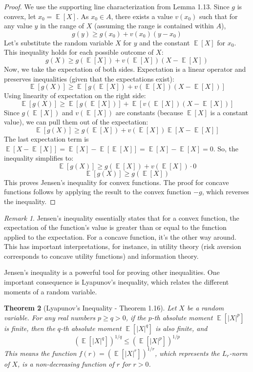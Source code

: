 \documentclass[11pt]{article}
\newtheorem{theorem}{Theorem}[section]
\theoremstyle{definition}
\theoremstyle{remark}
\newtheorem{remark}[theorem]{Remark}
\DeclareMathOperator{\E}{\mathbb{E}} %
\begin{document}
\begin{proof}
We use the supporting line characterization from Lemma 1.13. Since $g$ is convex, let $x_0 = \E[X]$. As $x_0 \in A$, there exists a value $v(x_0)$ such that for any value $y$ in the range of $X$ (assuming the range is contained within $A$),
\[
g(y) \ge g(x_0) + v(x_0)(y-x_0)
\]
Let's substitute the random variable $X$ for $y$ and the constant $\E[X]$ for $x_0$. This inequality holds for each possible outcome of $X$:
\[
g(X) \ge g(\E[X]) + v(\E[X])(X - \E[X])
\]
Now, we take the expectation of both sides. Expectation is a linear operator and preserves inequalities (given that the expectations exist):
\[
\E[g(X)] \ge \E[g(\E[X]) + v(\E[X])(X - \E[X])]
\]
Using linearity of expectation on the right side:
\[
\E[g(X)] \ge \E[g(\E[X])] + \E[v(\E[X])(X - \E[X])]
\]
Since $g(\E[X])$ and $v(\E[X])$ are constants (because $\E[X]$ is a constant value), we can pull them out of the expectation:
\[
\E[g(X)] \ge g(\E[X]) + v(\E[X]) \E[X - \E[X]]
\]
The last expectation term is $\E[X - \E[X]] = \E[X] - \E[\E[X]] = \E[X] - \E[X] = 0$.
So, the inequality simplifies to:
\[
\E[g(X)] \ge g(\E[X]) + v(\E[X]) \cdot 0
\]
\[
\E[g(X)] \ge g(\E[X])
\]
This proves Jensen's inequality for convex functions. The proof for concave functions follows by applying the result to the convex function $-g$, which reverses the inequality.
\end{proof}

\begin{remark}
Jensen's inequality essentially states that for a convex function, the expectation of the function's value is greater than or equal to the function applied to the expectation. For a concave function, it's the other way around. This has important interpretations, for instance, in utility theory (risk aversion corresponds to concave utility functions) and information theory.
\end{remark}

Jensen's inequality is a powerful tool for proving other inequalities. One important consequence is Lyapunov's inequality, which relates the different moments of a random variable.

\begin{theorem}[Lyapunov's Inequality - Theorem 1.16]
Let $X$ be a random variable. For any real numbers $p \ge q > 0$, if the $p$-th absolute moment $\E[|X|^p]$ is finite, then the $q$-th absolute moment $\E[|X|^q]$ is also finite, and
\[
\left(\E[|X|^{q}]\right)^{1 / q} \leq\left(\E[|X|^{p}]\right)^{1 / p}
\]
This means the function $f(r) = (\E[|X|^r])^{1/r}$, which represents the $L_r$-norm of $X$, is a non-decreasing function of $r$ for $r > 0$.
\end{theorem}
\end{document}
